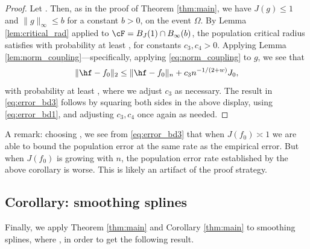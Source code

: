 \documentclass{article}
\begin{document}
\begin{proof}
Let . Then, as in the proof of Theorem
\ref{thm:main}, we have $J(g) \leq 1$ and $\|g\|_\infty \leq b$ for a constant
$b>0$, on the event $\Omega$. By Lemma \ref{lem:critical_rad} applied to $\cF = 
B_J(1) \cap B_\infty(b)$, the population critical radius satisfies
 with probability at least , for constants 
$c_3,c_4>0$. Applying Lemma \ref{lem:norm_coupling}---specifically, applying
\eqref{eq:norm_coupling} to $g$, we see that  
\[
\|\hf - f_0\|_2 \leq \|\hf - f_0\|_n + c_3 n^{-1/(2+w)} J_0,
\]
with probability at least , where we adjust $c_3$ as necessary. The result in
\eqref{eq:error_bd3} follows by squaring both sides in the above display, using
\eqref{eq:error_bd1}, and adjusting $c_3,c_4$ once again as needed.  
\end{proof}

A remark: choosing , we see from \eqref{eq:error_bd3} that when $J(f_0) \asymp 1$ we are
able to bound the population error at the same rate  as
the empirical error. But when $J(f_0)$ is growing with $n$, the population
error rate established by the above corollary is worse. This is likely an
artifact of the proof strategy.  

\subsection{Corollary: smoothing splines}

Finally, we apply Theorem \ref{thm:main} and Corollary \ref{thm:main} to
smoothing splines, where , in order 
to get the following result.  
\end{document}
